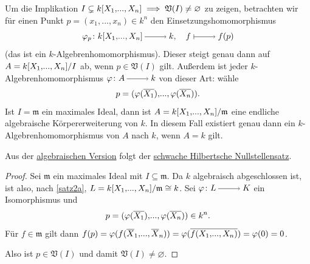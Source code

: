 \documentclass[a4paper,12pt,index=toc]{scrbook}
\theoremstyle{keinenummern} %
\def\V{\mathfrak{V}}
\def\m{\mathfrak{m}}
\renewcommand{\phi}{\varphi}
\newcommand{\leer}{\ensuremath{\varnothing}}
\renewcommand{\dotsc}{\ensuremath{\!...}}
\def\Bar#1{\ensuremath\overline{#1}}
\newcommand{\polyx}[1][n]{\ensuremath%
  [X_{1},\dotsc,X_{#1}]}
\begin{document}

Um die Implikation $I\subsetneq k\polyx \implies \V(I)\neq\leer$ zu zeigen, betrachten wir für einen Punkt $p=(x_1,\dotsc,x_n)\in
k^n$ den Einsetzungshomomorphismus \[ \phi_p\colon k\polyx \ra k, \quad f\mapsto f(p) \] (das ist ein
$k$-Algebrenhomomorphismus). Dieser steigt genau dann auf $A=\Quotient{k\polyx}{I}$ ab, wenn $p\in\V(I)$ gilt. Außerdem ist jeder
$k$-Algebrenhomomorphismus $\phi\colon A\ra k$ von dieser Art: wähle \[p=(\phi(\Bar{X_1}),\dotsc,\phi(\Bar{X_n})).\] Ist $I=\m$ ein
maximales Ideal, dann ist $A=\Quotient{k\polyx}{\m}$ eine endliche algebraische Körpererweiterung von $k$. In diesem Fall
existiert genau dann ein $k$-Algebrenhomomorphismus von $A$ nach $k$, wenn $A=k$ gilt.

\begin{lem}\label{1.3.4}
  Aus der \hyperref[satz2a]{algebraischen Version} folgt der \hyperref[satz2b]{schwache Hilbertsche Nullstellensatz}.
\end{lem}
\begin{proof}
  Sei $\m$ ein maximales Ideal mit $I\subseteq\m$. Da $k$ algebraisch abgeschlossen ist, ist also, nach \cref{satz2a},
  $L=\Quotient{k\polyx}{\m}\cong k$. Sei $\phi\colon L\ra K$ ein Isomorphismus und \[p=(\phi(\Bar{X_1}),\dotsc,\phi(\Bar{X_n}))\in
  k^n.\] Für $f\in\m$ gilt dann $f(p)=\phi(f(\Bar{X}_1,\dotsc,\Bar{X}_n))=\phi(\Bar{f(X_1,\dotsc,X_n)}) = \phi(0)=0$. 
  
Also ist $p\in\V(I)$ und damit $\V(I)\neq\leer$.
\end{proof}
\end{document}
